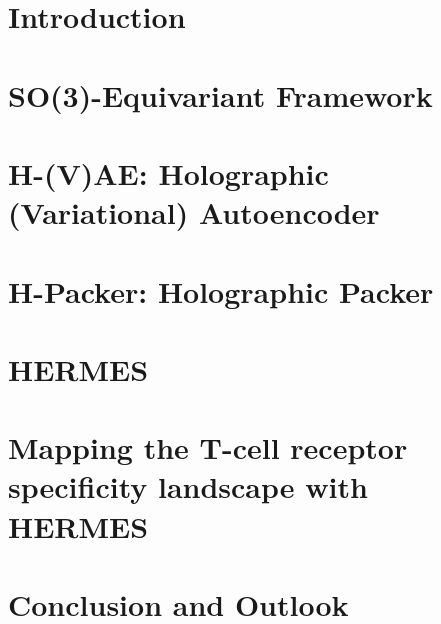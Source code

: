 \documentclass[12pt, english]{uw_thesis}
\begin{document}

\tableofcontents
\listoffigures
\listoftables

\mainmatter

\chapter{Introduction}
\label{sec:introduction}


\chapter{SO(3)-Equivariant Framework}
\label{sec:background}


\chapter{H-(V)AE: Holographic (Variational) Autoencoder}
\label{sec:hvae}


\chapter{H-Packer: Holographic Packer}
\label{sec:hpacker}


\chapter{HERMES}
\label{sec:hermes}


\chapter{Mapping the T-cell receptor specificity landscape with HERMES}
\label{sec:tcrpmhc}


\chapter{Conclusion and Outlook}
\label{sec:conclusion}



\printbibliography[title=References,heading=bibintoc]


\newpage
\end{document}
